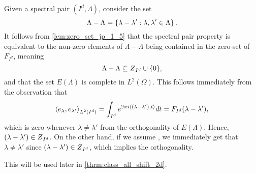 \documentclass[../thesis.tex]{subfiles}
\begin{document}
\begin{remark}\label{rem:zero_set_orthogonal} 
    Given a spectral pair $(I^d,\Lambda)$, consider the set
    \begin{equation}\label{eq:zero_set_orthogonal}
        \Lambda - \Lambda = \left\{\lambda-\lambda' : \lambda,\lambda' \in \Lambda\right\}.
    \end{equation}
    It follows from \cref{lem:zero_set_jp_1_5} that the spectral pair property is equivalent to the non-zero elements of $\Lambda - \Lambda$ being contained in the zero-set of $F_{I^d}$, meaning 
    \begin{equation*}  %
        \Lambda - \Lambda \subseteq \Zstroke_{I^d} \cup \braq{0},
    \end{equation*}
    and that the set $E(\Lambda)$ is complete in $L^2(\Omega)$. This follows immediately from the observation that
    \begin{equation*}
        \left \langle e_{\lambda},e_{\lambda'}  \right \rangle_{L^2(I^d)} = \int_{I^d} e^{2 \pi i \langle(\lambda-\lambda'),t\rangle} dt = F_{I^d} (\lambda-\lambda'),
    \end{equation*}
    which is zero whenever $\lambda \neq \lambda'$ from the orthogonality of $E(\Lambda)$. Hence, $(\lambda-\lambda') \in \Zstroke_{I^d}$. On the other hand, if we assume , we immediately get that $\lambda \neq \lambda'$ since $(\lambda-\lambda') \in \Zstroke_{I^d}$, which implies the orthogonality.  %
    
\end{remark}
This  will be used later in \cref{thrm:class_all_shift_2d}. %
\end{document}

